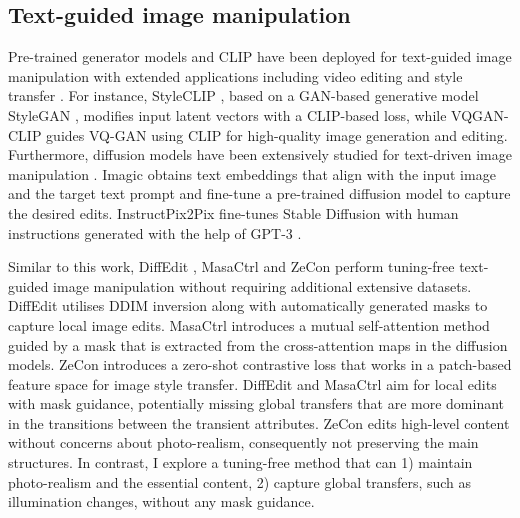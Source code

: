 \subsection{Text-guided image manipulation}
Pre-trained generator models and CLIP \cite{radford2021learning} have been deployed for text-guided image manipulation with extended applications including video editing and style transfer \cite{bar2022text2live, gal2022stylegan,kwon2022clipstyler, liu2021fusedream, patashnik2021styleclip}. For instance, StyleCLIP \cite{patashnik2021styleclip}, based on a GAN-based generative model StyleGAN \cite{karras2020analyzing}, modifies input latent vectors with a CLIP-based loss, while VQGAN-CLIP \cite{crowson2022vqgan} guides VQ-GAN \cite{esser2021taming} using CLIP for high-quality image generation and editing. Furthermore, diffusion models have been extensively studied for text-driven image manipulation \cite{avrahami2022blended, gal2022image, kawar2023imagic, kim2022diffusionclip, liu2023more, meng2021sdedit,nichol2021glide,ruiz2023dreambooth}. Imagic \cite{kawar2023imagic} obtains text embeddings that align with the input image and the target text prompt and fine-tune a pre-trained diffusion model to capture the desired edits. InstructPix2Pix \cite{brooks2023instructpix2pix} fine-tunes Stable Diffusion \cite{rombach2022high} with human instructions generated with the help of GPT-3 \cite{brown2020language}. 

Similar to this work, DiffEdit  \cite{couairon2022diffedit}, MasaCtrl \cite{cao2023masactrl} and ZeCon \cite{yang2023zero} perform tuning-free text-guided image manipulation without requiring additional extensive datasets. DiffEdit  \cite{couairon2022diffedit} utilises DDIM inversion \cite{dhariwal2021diffusion, song2020denoising} along with automatically generated masks to capture local image edits. MasaCtrl \cite{cao2023masactrl} introduces a mutual self-attention method guided by a mask that is extracted from the cross-attention maps in the diffusion models. ZeCon \cite{yang2023zero} introduces a zero-shot contrastive loss that works in a patch-based feature space for image style transfer. DiffEdit  \cite{couairon2022diffedit} and MasaCtrl \cite{cao2023masactrl} aim for local edits with mask guidance, potentially missing global transfers that are more dominant in the transitions between the transient attributes. ZeCon \cite{yang2023zero} edits high-level content without concerns about photo-realism, consequently not preserving the main structures. In contrast, I explore a tuning-free method that can 1) maintain photo-realism and the essential content, 2) capture global transfers, such as illumination changes, without any mask guidance.

